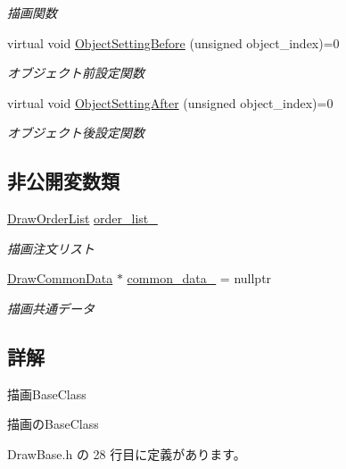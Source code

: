 \begin{DoxyCompactItemize}
\begin{DoxyCompactList}\small\item\em 描画関数 \end{DoxyCompactList}\item 
virtual void \mbox{\hyperlink{class_draw_base_a9bf55f6b67735e0bff42d749f43826c1}{Object\+Setting\+Before}} (unsigned object\+\_\+index)=0
\begin{DoxyCompactList}\small\item\em オブジェクト前設定関数 \end{DoxyCompactList}\item 
virtual void \mbox{\hyperlink{class_draw_base_ab1592d0f04fb49289758008dcff4e7a0}{Object\+Setting\+After}} (unsigned object\+\_\+index)=0
\begin{DoxyCompactList}\small\item\em オブジェクト後設定関数 \end{DoxyCompactList}\end{DoxyCompactItemize}
\subsection*{非公開変数類}
\begin{DoxyCompactItemize}
\item 
\mbox{\hyperlink{class_draw_order_list}{Draw\+Order\+List}} \mbox{\hyperlink{class_draw_base_a68325df7021177f7ca82a18511e1328f}{order\+\_\+list\+\_\+}}
\begin{DoxyCompactList}\small\item\em 描画注文リスト \end{DoxyCompactList}\item 
\mbox{\hyperlink{class_draw_common_data}{Draw\+Common\+Data}} $\ast$ \mbox{\hyperlink{class_draw_base_a44e99e97b203c9cffa794b65df77539a}{common\+\_\+data\+\_\+}} = nullptr
\begin{DoxyCompactList}\small\item\em 描画共通データ \end{DoxyCompactList}\end{DoxyCompactItemize}


\subsection{詳解}
描画\+Base\+Class 

描画の\+Base\+Class 

 Draw\+Base.\+h の 28 行目に定義があります。



